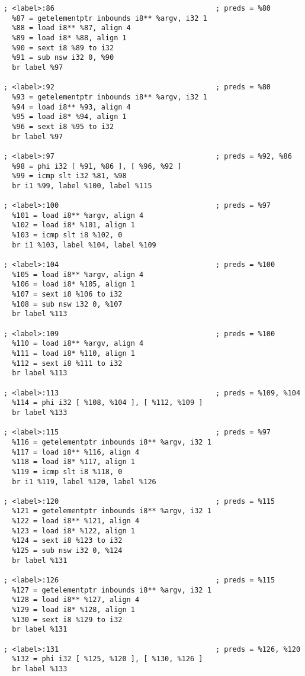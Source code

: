 \begin{lstlisting}
; <label>:86                                      ; preds = %80
  %87 = getelementptr inbounds i8** %argv, i32 1
  %88 = load i8** %87, align 4
  %89 = load i8* %88, align 1
  %90 = sext i8 %89 to i32
  %91 = sub nsw i32 0, %90
  br label %97

; <label>:92                                      ; preds = %80
  %93 = getelementptr inbounds i8** %argv, i32 1
  %94 = load i8** %93, align 4
  %95 = load i8* %94, align 1
  %96 = sext i8 %95 to i32
  br label %97

; <label>:97                                      ; preds = %92, %86
  %98 = phi i32 [ %91, %86 ], [ %96, %92 ]
  %99 = icmp slt i32 %81, %98
  br i1 %99, label %100, label %115

; <label>:100                                     ; preds = %97
  %101 = load i8** %argv, align 4
  %102 = load i8* %101, align 1
  %103 = icmp slt i8 %102, 0
  br i1 %103, label %104, label %109

; <label>:104                                     ; preds = %100
  %105 = load i8** %argv, align 4
  %106 = load i8* %105, align 1
  %107 = sext i8 %106 to i32
  %108 = sub nsw i32 0, %107
  br label %113

; <label>:109                                     ; preds = %100
  %110 = load i8** %argv, align 4
  %111 = load i8* %110, align 1
  %112 = sext i8 %111 to i32
  br label %113

; <label>:113                                     ; preds = %109, %104
  %114 = phi i32 [ %108, %104 ], [ %112, %109 ]
  br label %133

; <label>:115                                     ; preds = %97
  %116 = getelementptr inbounds i8** %argv, i32 1
  %117 = load i8** %116, align 4
  %118 = load i8* %117, align 1
  %119 = icmp slt i8 %118, 0
  br i1 %119, label %120, label %126

; <label>:120                                     ; preds = %115
  %121 = getelementptr inbounds i8** %argv, i32 1
  %122 = load i8** %121, align 4
  %123 = load i8* %122, align 1
  %124 = sext i8 %123 to i32
  %125 = sub nsw i32 0, %124
  br label %131

; <label>:126                                     ; preds = %115
  %127 = getelementptr inbounds i8** %argv, i32 1
  %128 = load i8** %127, align 4
  %129 = load i8* %128, align 1
  %130 = sext i8 %129 to i32
  br label %131

; <label>:131                                     ; preds = %126, %120
  %132 = phi i32 [ %125, %120 ], [ %130, %126 ]
  br label %133


\end{lstlisting}

